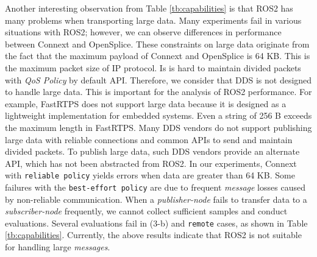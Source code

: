 \documentclass{sig-alternate-05-2015}
\begin{document}
Another interesting observation from Table \ref{tb:capabilities} is that ROS2 has many problems when transporting large data.
Many experiments fail in various situations with ROS2; however, we can observe differences in performance between Connext and OpenSplice.
These constraints on large data originate from the fact that the maximum payload of Connext and OpenSplice is 64 KB.
This is the maximum packet size of IP protocol.
Is is hard to maintain divided packets with \emph{QoS Policy} by default API.
Therefore, we consider that DDS is not designed to handle large data.
This is important for the analysis of ROS2 performance.
For example, FastRTPS does not support large data because it is designed as a lightweight implementation for embedded systems. 
Even a string of 256 B exceeds the maximum length in FastRTPS.
Many DDS vendors do not support publishing large data with reliable connections and common APIs to send and maintain divided packets. 
To publish large data, such DDS vendors provide an alternate API, which has not been abstracted from ROS2. 
In our experiments, Connext with \texttt{reliable policy} yields errors when data are greater than 64 KB.
Some failures with the \texttt{best-effort policy} are due to frequent \emph{message} losses caused by non-reliable communication. 
When a \emph{publisher-node} fails to transfer data to a \emph{subscriber-node} frequently, we cannot collect sufficient samples and conduct evaluations.
Several evaluations fail in (3-b) and \texttt{remote} cases, as shown in Table \ref{tb:capabilities}.
Currently, the above results indicate that ROS2 is not suitable for handling large \emph{messages}.
\end{document}
